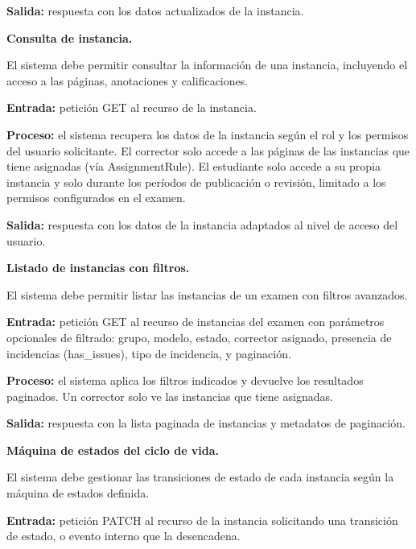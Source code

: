 \begin{functional}
\begin{functional}
    \textbf{Salida:} respuesta con los datos actualizados de la instancia.

    \item \textbf{Consulta de instancia.}

    El sistema debe permitir consultar la información de una instancia, incluyendo el acceso a las páginas, anotaciones y calificaciones.

    \textbf{Entrada:} petición GET al recurso de la instancia.

    \textbf{Proceso:} el sistema recupera los datos de la instancia según el rol y los permisos del usuario solicitante. El corrector solo accede a las páginas de las instancias que tiene asignadas (vía AssignmentRule). El estudiante solo accede a su propia instancia y solo durante los períodos de publicación o revisión, limitado a los permisos configurados en el examen.

    \textbf{Salida:} respuesta con los datos de la instancia adaptados al nivel de acceso del usuario.

    \item \textbf{Listado de instancias con filtros.}

    El sistema debe permitir listar las instancias de un examen con filtros avanzados.

    \textbf{Entrada:} petición GET al recurso de instancias del examen con parámetros opcionales de filtrado: grupo, modelo, estado, corrector asignado, presencia de incidencias (has\_issues), tipo de incidencia, y paginación.

    \textbf{Proceso:} el sistema aplica los filtros indicados y devuelve los resultados paginados. Un corrector solo ve las instancias que tiene asignadas.

    \textbf{Salida:} respuesta con la lista paginada de instancias y metadatos de paginación.

    \item \textbf{Máquina de estados del ciclo de vida.}

    El sistema debe gestionar las transiciones de estado de cada instancia según la máquina de estados definida.

    \textbf{Entrada:} petición PATCH al recurso de la instancia solicitando una transición de estado, o evento interno que la desencadena.


\end{functional}
\end{functional}
